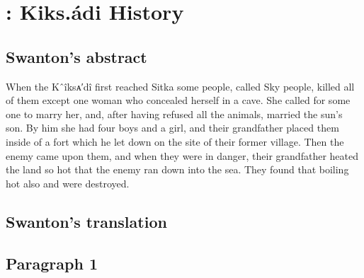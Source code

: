 
\resetexcnt
\chapter{: Kiks.ádi History}\label{ch:96-kiks.adi-history}

\section{Swanton’s abstract}\label{sec:96-swanton-abstract}

When the Kˆîksᴀ′dî first reached Sitka some people, called Sky people, killed all of them except one woman who concealed herself in a cave.
She called for some one to marry her, and, after having refused all the animals, married the sun’s son.
By him she had four boys and a girl, and their grandfather placed them inside of a fort which he let down on the site of their former village.
Then the enemy came upon them, and when they were in danger, their grandfather heated the land so hot that the enemy ran down into the sea.
They found that boiling hot also and were destroyed.

\section{Swanton’s translation}\label{sec:96-swanton-translation}

\section{Paragraph 1}\label{sec:96-para-1}

